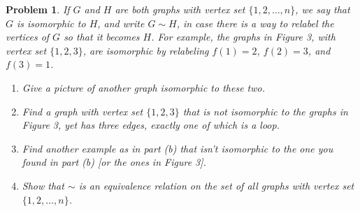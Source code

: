 \documentclass[12pt]{article}
\newtheorem{problem}{Problem}
\begin{document}
\setcounter{problem}{4}
\begin{problem}
If $G$ and $H$ are both graphs with vertex set $\{1, 2, \ldots, n\}$, we say that $G$ is isomorphic to $H$, and write $G \sim H$, in case there is a way to relabel the vertices of $G$ so that it becomes $H$. For example, the graphs in Figure 3, with vertex set $\{1, 2, 3\}$, are isomorphic by relabeling $f(1) = 2$, $f(2) = 3$, and $f(3) = 1$.

\hspace{1cm}

\begin{enumerate}[label=(\alph*)]
    \item Give a picture of another graph isomorphic to these two.

    \item Find a graph with vertex set $\{1, 2, 3\}$ that is not isomorphic to the graphs in Figure 3, yet has three edges, exactly one of which is a loop.

    \item Find another example as in part (b) that isn't isomorphic to the one you found in part (b) [or the ones in Figure 3].

    \item Show that $\sim$ is an equivalence relation on the set of all graphs with vertex set $\{1, 2, \ldots, n\}$.
\end{enumerate}
\end{problem}
\end{document}
